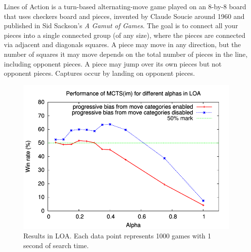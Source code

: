 \documentclass[letterpaper]{article}
\begin{document}
Lines of Action is a turn-based alternating-move game played on an 8-by-8 board that uses checkers board and pieces, 
invented by Claude Soucie around 1960 and published in Sid Sackson's {\it A Gamut of Games}. 
The goal is to connect all your pieces into a single connected group (of any size), 
where the pieces are connected via adjacent and diagonals squares. A piece may move in any direction, but the number of squares 
it may move depends on the total number of pieces in the line, including opponent pieces. A piece may jump over its own
pieces but not opponent pieces. Captures occur by landing on opponent pieces. 

\begin{figure}
\begin{center}
\includegraphics[scale=0.7]{plots/loa-alpha}
\caption{Results in LOA. Each data point represents 1000 games with 1 second of search time.} 
\label{fig:loa-alpha}
\end{center}
\end{figure}



\end{document}
